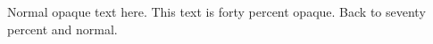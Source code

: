 \documentclass{article}
\begin{document}
Normal opaque text here.
{ This text is forty percent opaque.}
Back to { seventy percent} and normal.
\end{document}
